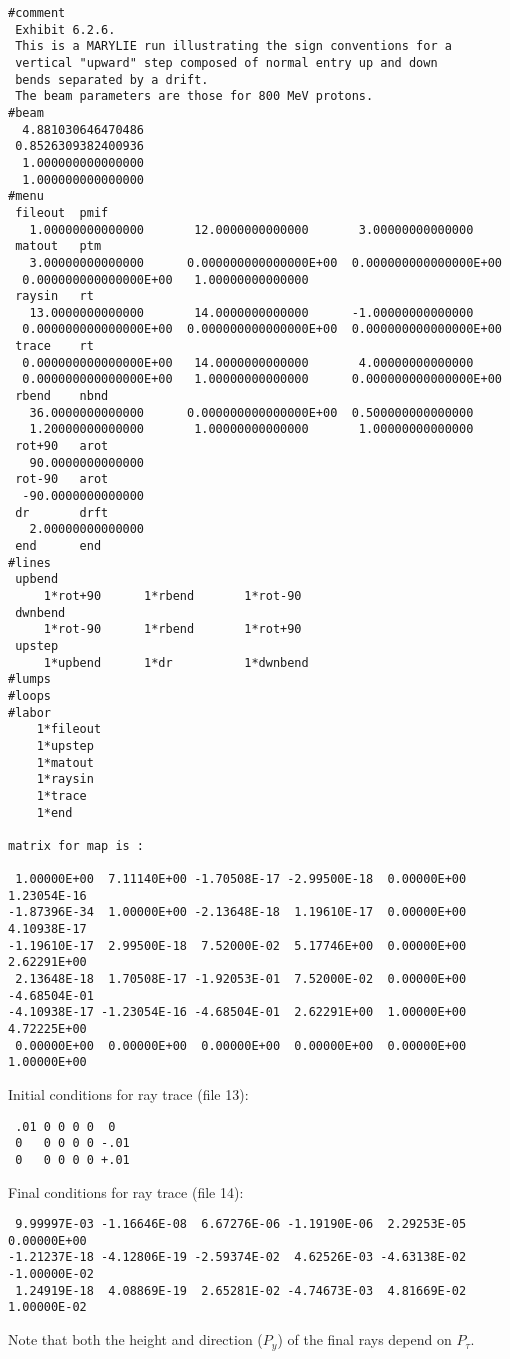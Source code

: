 \newpage
\begin{footnotesize}
\begin{verbatim}
#comment
 Exhibit 6.2.6.
 This is a MARYLIE run illustrating the sign conventions for a
 vertical "upward" step composed of normal entry up and down
 bends separated by a drift.
 The beam parameters are those for 800 MeV protons.
#beam
  4.881030646470486
 0.8526309382400936
  1.000000000000000
  1.000000000000000
#menu
 fileout  pmif
   1.00000000000000       12.0000000000000       3.00000000000000
 matout   ptm
   3.00000000000000      0.000000000000000E+00  0.000000000000000E+00
  0.000000000000000E+00   1.00000000000000
 raysin   rt
   13.0000000000000       14.0000000000000      -1.00000000000000
  0.000000000000000E+00  0.000000000000000E+00  0.000000000000000E+00
 trace    rt
  0.000000000000000E+00   14.0000000000000       4.00000000000000
  0.000000000000000E+00   1.00000000000000      0.000000000000000E+00
 rbend    nbnd
   36.0000000000000      0.000000000000000E+00  0.500000000000000
   1.20000000000000       1.00000000000000       1.00000000000000
 rot+90   arot
   90.0000000000000
 rot-90   arot
  -90.0000000000000
 dr       drft
   2.00000000000000
 end      end
#lines
 upbend
     1*rot+90      1*rbend       1*rot-90
 dwnbend
     1*rot-90      1*rbend       1*rot+90
 upstep
     1*upbend      1*dr          1*dwnbend
#lumps
#loops
#labor
    1*fileout
    1*upstep
    1*matout
    1*raysin
    1*trace
    1*end

matrix for map is :

 1.00000E+00  7.11140E+00 -1.70508E-17 -2.99500E-18  0.00000E+00  1.23054E-16
-1.87396E-34  1.00000E+00 -2.13648E-18  1.19610E-17  0.00000E+00  4.10938E-17
-1.19610E-17  2.99500E-18  7.52000E-02  5.17746E+00  0.00000E+00  2.62291E+00
 2.13648E-18  1.70508E-17 -1.92053E-01  7.52000E-02  0.00000E+00 -4.68504E-01
-4.10938E-17 -1.23054E-16 -4.68504E-01  2.62291E+00  1.00000E+00  4.72225E+00
 0.00000E+00  0.00000E+00  0.00000E+00  0.00000E+00  0.00000E+00  1.00000E+00
\end{verbatim}
\end{footnotesize}
Initial conditions for ray trace (file 13):
\begin{footnotesize}
\begin{verbatim}
 .01 0 0 0 0  0
 0   0 0 0 0 -.01
 0   0 0 0 0 +.01
\end{verbatim}
\end{footnotesize}
Final conditions for ray trace (file 14):
\begin{footnotesize}
\begin{verbatim}
 9.99997E-03 -1.16646E-08  6.67276E-06 -1.19190E-06  2.29253E-05  0.00000E+00
-1.21237E-18 -4.12806E-19 -2.59374E-02  4.62526E-03 -4.63138E-02 -1.00000E-02
 1.24919E-18  4.08869E-19  2.65281E-02 -4.74673E-03  4.81669E-02  1.00000E-02
\end{verbatim}
\end{footnotesize}
Note that both the height and direction ($P_y$) of the final rays depend on $P_\tau$.

